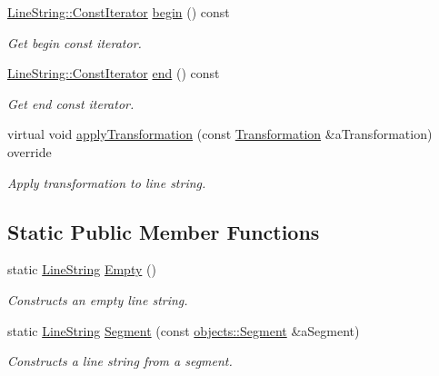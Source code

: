 \begin{DoxyCompactItemize}
\hyperlink{classlibrary_1_1math_1_1geom_1_1d3_1_1objects_1_1_line_string_a87db0104282f9fcccdc5b1b99e2301e5}{Line\+String\+::\+Const\+Iterator} \hyperlink{classlibrary_1_1math_1_1geom_1_1d3_1_1objects_1_1_line_string_a218630b02ea7a4f32872fd1ee25f3359}{begin} () const
\begin{DoxyCompactList}\small\item\em Get begin const iterator. \end{DoxyCompactList}\item 
\hyperlink{classlibrary_1_1math_1_1geom_1_1d3_1_1objects_1_1_line_string_a87db0104282f9fcccdc5b1b99e2301e5}{Line\+String\+::\+Const\+Iterator} \hyperlink{classlibrary_1_1math_1_1geom_1_1d3_1_1objects_1_1_line_string_a83d9d9ba96fc956a900a7cd2dbf3e82b}{end} () const
\begin{DoxyCompactList}\small\item\em Get end const iterator. \end{DoxyCompactList}\item 
virtual void \hyperlink{classlibrary_1_1math_1_1geom_1_1d3_1_1objects_1_1_line_string_a8a20f45b2af9cc45dbf7aff9e5d4824e}{apply\+Transformation} (const \hyperlink{classlibrary_1_1math_1_1geom_1_1d3_1_1_transformation}{Transformation} \&a\+Transformation) override
\begin{DoxyCompactList}\small\item\em Apply transformation to line string. \end{DoxyCompactList}\end{DoxyCompactItemize}
\subsection*{Static Public Member Functions}
\begin{DoxyCompactItemize}
\item 
static \hyperlink{classlibrary_1_1math_1_1geom_1_1d3_1_1objects_1_1_line_string}{Line\+String} \hyperlink{classlibrary_1_1math_1_1geom_1_1d3_1_1objects_1_1_line_string_ae9e05ddb3ab59060c78d18e19624f307}{Empty} ()
\begin{DoxyCompactList}\small\item\em Constructs an empty line string. \end{DoxyCompactList}\item 
static \hyperlink{classlibrary_1_1math_1_1geom_1_1d3_1_1objects_1_1_line_string}{Line\+String} \hyperlink{classlibrary_1_1math_1_1geom_1_1d3_1_1objects_1_1_line_string_a7fb1bcb80907e72aa55f0692ed2517f1}{Segment} (const \hyperlink{classlibrary_1_1math_1_1geom_1_1d3_1_1objects_1_1_segment}{objects\+::\+Segment} \&a\+Segment)
\begin{DoxyCompactList}\small\item\em Constructs a line string from a segment. \end{DoxyCompactList}\end{DoxyCompactItemize}


